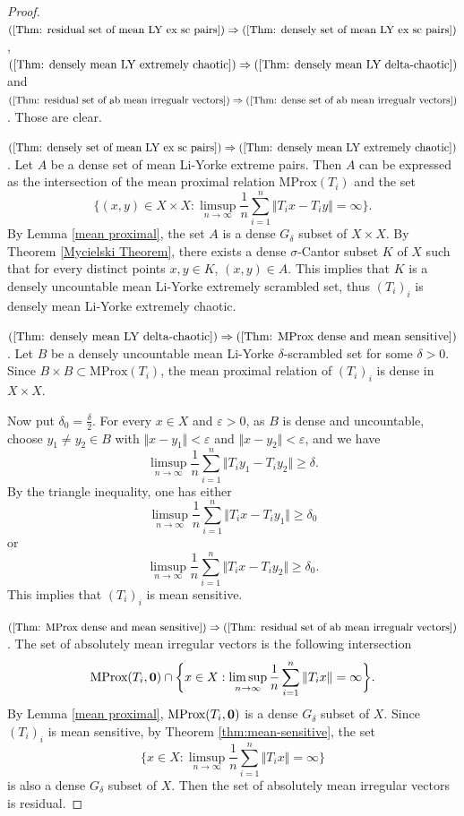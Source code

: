 \documentclass[12pt,a4paper]{amsart}
\theoremstyle{definition}
\theoremstyle{plain}
\begin{document}
\begin{proof}
      $ (\ref{Thm: residual set of mean LY ex sc pairs})  \Rightarrow (\ref{Thm: densely set of mean LY ex sc pairs})$, 
      $(\ref{Thm: densely mean LY extremely chaotic}) \Rightarrow (\ref{Thm: densely mean LY delta-chaotic})$ 
      and 
      $(\ref{Thm: residual set of ab mean irregualr vectors})\Rightarrow (\ref{Thm: dense set of ab mean irregualr vectors} )$. 
      Those are clear.
 
    $(\ref{Thm: densely set of mean LY ex sc pairs}) \Rightarrow (\ref{Thm: densely mean LY extremely chaotic})$. 
    Let $A$ be a dense set of mean Li-Yorke extreme pairs. Then $A$ can be expressed as the intersection of the mean proximal relation $\text{MProx}(T_i)$
    and the set
    \[
        \biggl\{(x,y)\in X\times X: \limsup_{n\to \infty} \frac{1}{n} \sum_{i=1}^n \Vert T_ix-T_iy \Vert =\infty \biggr\}.
    \]
    By Lemma \ref{mean proximal}, the set $A$ is a dense $G_{\delta}$ subset of $X\times X$.
    By Theorem \ref{Mycielski Theorem}, there exists a dense $\sigma$-Cantor subset $K$ of $X$ such that for every distinct points $x, y\in K$, $(x, y)\in A$.
    This implies that $K$ is a densely uncountable mean Li-Yorke extremely scrambled set,
    thus $(T_i)_i$ is densely mean Li-Yorke extremely  chaotic.

    $(\ref{Thm: densely mean LY delta-chaotic}) \Rightarrow (\ref{Thm: MProx dense and mean sensitive})$. Let $B$ be a densely uncountable mean Li-Yorke $\delta$-scrambled set for some $\delta>0$.
    Since $B\times B \subset \text{MProx}(T_i)$, the mean proximal relation of $(T_i)_i$ is dense in $X\times X$.

    Now put $\delta_0=\frac{\delta}{2}$. For every $x\in X$ and $\varepsilon>0$,
    as $B$ is dense and uncountable, choose $y_1 \neq y_2\in B$ with $\Vert x-y_1 \Vert <\varepsilon$ and
    $\Vert x-y_2 \Vert <\varepsilon$,
    and we have
    \[
        \limsup_{n\to \infty} \frac{1}{n} \sum_{i=1}^{n} \Vert T_iy_1-T_iy_2 \Vert \geq \delta.
    \]
    By the triangle inequality, one has either
    \[
        \limsup_{n\to \infty} \frac{1}{n} \sum_{i=1}^{n} \Vert T_ix-T_iy_1 \Vert \geq \delta_0
    \]
    or
    \[
        \limsup_{n\to \infty} \frac{1}{n} \sum_{i=1}^{n} \Vert T_ix-T_iy_2 \Vert \geq \delta_0.
    \]
    This implies that $(T_i)_i$ is mean sensitive.

    $(\ref{Thm: MProx dense and mean sensitive}) \Rightarrow (\ref{Thm: residual set of ab mean irregualr vectors})$. 
    The set of absolutely mean irregular vectors is the following intersection
    \[
        \text{MProx}(T_i, {\bf 0}) \cap \biggl\{x\in X: \limsup_{n\to \infty} \frac{1}{n} \sum_{i=1}^{n} \Vert T_ix \Vert =\infty\biggr\}.
    \]
    By Lemma \ref{mean proximal}, $\text{MProx}(T_i, {\bf 0})$ is a dense $G_{\delta}$ subset of $X$.
    Since $(T_i)_i$ is mean sensitive, by Theorem \ref{thm:mean-sensitive}, the set
    \[
        \biggl\{x\in X: \limsup_{n\to \infty} \frac{1}{n} \sum_{i=1}^{n} \Vert T_ix \Vert =\infty\biggr\}
    \]
    is also a dense $G_{\delta}$ subset of $X$. Then the set of absolutely mean irregular vectors is residual.


\end{proof}
\end{document}
